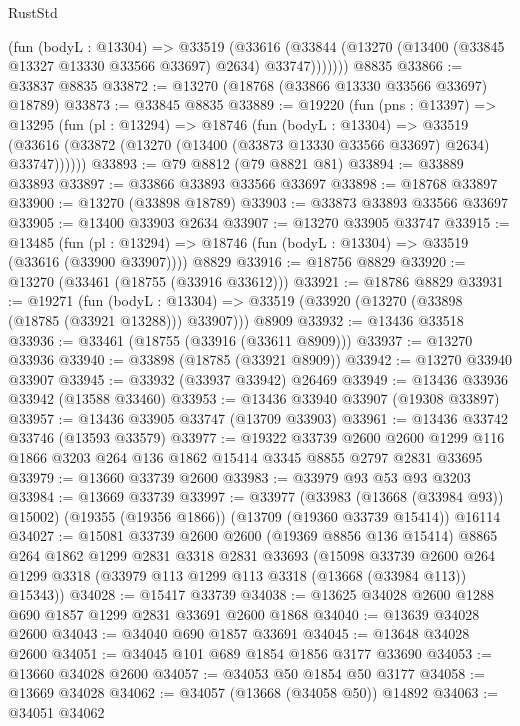 \begin{lexlean}{RustStd}
\begin{coremodule}
          (fun (bodyL : @13304) =>
          @33519
            (@33616
              (@33844 (@13270 (@13400 (@33845 @13327 @13330 @33566 @33697) @2634) @33747)))))))
    @8835
@33866 := @33837 @8835
@33872 := @13270 (@18768 (@33866 @13330 @33566 @33697) @18789)
@33873 := @33845 @8835
@33889 := @19220
    (fun (pns : @13397) =>
    @13295
      (fun (pl : @13294) =>
      @18746
        (fun (bodyL : @13304) =>
        @33519 (@33616 (@33872 (@13270 (@13400 (@33873 @13330 @33566 @33697) @2634) @33747))))))
@33893 := @79 @8812 (@79 @8821 @81)
@33894 := @33889 @33893
@33897 := @33866 @33893 @33566 @33697
@33898 := @18768 @33897
@33900 := @13270 (@33898 @18789)
@33903 := @33873 @33893 @33566 @33697
@33905 := @13400 @33903 @2634
@33907 := @13270 @33905 @33747
@33915 := @13485
    (fun (pl : @13294) => @18746 (fun (bodyL : @13304) => @33519 (@33616 (@33900 @33907))))
    @8829
@33916 := @18756 @8829
@33920 := @13270 (@33461 (@18755 (@33916 @33612)))
@33921 := @18786 @8829
@33931 := @19271
    (fun (bodyL : @13304) => @33519 (@33920 (@13270 (@33898 (@18785 (@33921 @13288))) @33907)))
    @8909
@33932 := @13436 @33518
@33936 := @33461 (@18755 (@33916 (@33611 @8909)))
@33937 := @13270 @33936
@33940 := @33898 (@18785 (@33921 @8909))
@33942 := @13270 @33940 @33907
@33945 := @33932 (@33937 @33942) @26469
@33949 := @13436 @33936 @33942 (@13588 @33460)
@33953 := @13436 @33940 @33907 (@19308 @33897)
@33957 := @13436 @33905 @33747 (@13709 @33903)
@33961 := @13436 @33742 @33746 (@13593 @33579)
@33977 := @19322
    @33739
    @2600
    @2600
    @1299
    @116
    @1866
    @3203
    @264
    @136
    @1862
    @15414
    @3345
    @8855
    @2797
    @2831
    @33695
@33979 := @13660 @33739 @2600
@33983 := @33979 @93 @53 @93 @3203
@33984 := @13669 @33739
@33997 := @33977
    (@33983 (@13668 (@33984 @93)) @15002)
    (@19355 (@19356 @1866))
    (@13709 (@19360 @33739 @15414))
    @16114
@34027 := @15081
    @33739
    @2600
    @2600
    (@19369 @8856 @136 @15414)
    @8865
    @264
    @1862
    @1299
    @2831
    @3318
    @2831
    @33693
    (@15098
      @33739
      @2600
      @264
      @1299
      @3318
      (@33979 @113 @1299 @113 @3318 (@13668 (@33984 @113)) @15343))
@34028 := @15417 @33739
@34038 := @13625 @34028 @2600 @1288 @690 @1857 @1299 @2831 @33691 @2600 @1868
@34040 := @13639 @34028 @2600
@34043 := @34040 @690 @1857 @33691
@34045 := @13648 @34028 @2600
@34051 := @34045 @101 @689 @1854 @1856 @3177 @33690
@34053 := @13660 @34028 @2600
@34057 := @34053 @50 @1854 @50 @3177
@34058 := @13669 @34028
@34062 := @34057 (@13668 (@34058 @50)) @14892
@34063 := @34051 @34062

\end{coremodule}
\end{lexlean}
